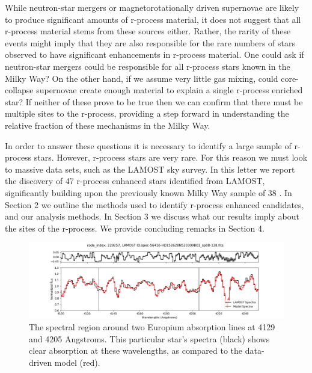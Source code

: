 \documentclass[a4paper,fleqn,usenatbib]{mnras}
\begin{document}
	While neutron-star mergers or magnetorotationally driven supernovae are likely to produce significant amounts of r-process material, it does not suggest that all r-process material stems from these sources either. Rather, the rarity of these events might imply that they are also responsible for the rare numbers of stars  observed to have significant enhancements in r-process material. One could ask if neutron-star mergers could be responsible for all r-process stars known in the Milky Way? On the other hand, if we assume very little gas mixing, could core-collapse supernovae create enough material to explain a single r-process enriched star? If neither of these prove to be true then we can confirm that there must be multiple sites to the r-process, providing a step forward in understanding the relative fraction of these mechanisms in the Milky Way.
	
	In order to answer these questions it is necessary to identify a large sample of r-process stars.
	However, r-process stars are very rare. For this reason we must look to massive data sets, such as the LAMOST sky survey. In this letter we report the discovery of 47 r-process enhanced stars identified from LAMOST, significantly building upon the previously known Milky Way sample of 38 \citep[e.g.,][]{masho2011,Honda2004,Hayek2009,Sneden2003,Ivans2006,Hill2002,Christlieb2004,Wako2010,placo2017,Sakari2018,Hansen2018}.
	In Section 2 we outline the methods used to identify r-process enhanced candidates, and our analysis methods. In Section 3 we discuss what our results imply about the sites of the r-process. We provide concluding remarks in Section 4.
	
	
	\begin{figure}
		\includegraphics[width=\textwidth]{229257}
		\caption{The spectral region around two Europium absorption lines at 4129 and 4205 Angstroms. This particular star's spectra (black) shows clear absorption at these wavelengths, as compared to the data-driven model (red).}
		\label{fig:starindex_229257}
	\end{figure}
	
\end{document}
